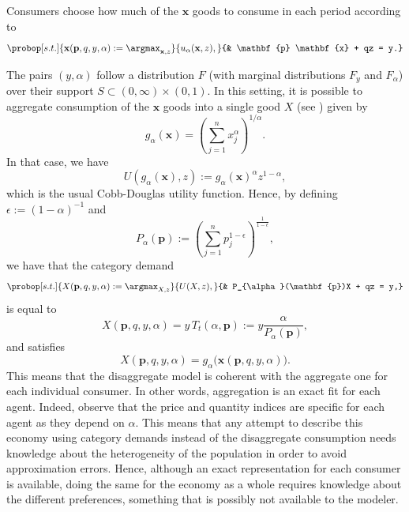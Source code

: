 \documentclass[english, a4paper, 12pt]{article}
\begin{document}
Consumers choose how much of the $\mathbf{x}$ goods to consume in each period according to
	\begin{equation} \label{eq:probdisagg}
		\probop[s.t.]{\mathbf{x}(\mathbf{p}, q, y, \alpha) 
			:= \argmax_{\mathbf{x}, z}}{u_{\alpha}(\mathbf{x}, z),}
				{&	\mathbf{p} \mathbf{x} + qz = y.}
	\end{equation} 

The pairs $(y,\alpha)$ follow a distribution $F$ (with marginal distributions $F_{y}$ and $F_{\alpha}$) over their support $S \subset (0,\infty) \times  (0,1)$. In this setting, it is possible to aggregate consumption of the $\mathbf{x}$ goods into a single good $X$ (see ) given by 
	\begin{equation} \label{eq:qtyindex}
		g_{\alpha}(\mathbf{x}) = \left(\sum_{j=1}^{n} x_{j}^{\alpha}\right)^{1/\alpha}.
	\end{equation}
In that case, we have
	\begin{equation} \label{eq:utilagg}
		U(g_{\alpha}(\mathbf{x}), z) := g_{\alpha}(\mathbf{x})^{\alpha}z^{1-\alpha},
	\end{equation}
which is the usual Cobb-Douglas utility function. Hence, by defining $\epsilon := (1-\alpha)^{-1}$ and
	\begin{equation} \label{eq:priceindex}
		P_{\alpha}(\mathbf{p}) :=  \left( \sum_{j=1}^{n} p_{j}^{1-\epsilon} \right)^{\frac{1}{1-\epsilon}},
	\end{equation}
we have that the category demand
	\begin{equation} \label{eq:probagg}
		\probop[s.t.]{X(\mathbf{p}, q, y, \alpha) := \argmax_{X, z}}{U(X,z),}
										{&	P_{\alpha}(\mathbf{p})X + qz = y,}
	\end{equation}
is equal to 
	\begin{equation} \label{eq:Xformula}
		X(\mathbf{p}, q,y,\alpha) = y\,T_{t}(\alpha, \mathbf{p}) := y \frac{\alpha}{P_{\alpha}(\mathbf{p})},
	\end{equation}
and satisfies 
	\begin{equation} \label{eq:aggequality}
		X(\mathbf{p}, q, y, \alpha) = g_{\alpha}\big(\mathbf{x}(\mathbf{p}, q, y, \alpha)\big).
	\end{equation}
This means that the disaggregate model is coherent with the aggregate one for each individual consumer. In other words, aggregation is an exact fit for each agent. Indeed, observe that the price and quantity indices are specific for each agent as they depend on $\alpha$. This means that any attempt to describe this economy using category demands instead of the disaggregate consumption needs knowledge about the heterogeneity of the population in order to avoid approximation errors. Hence, although an exact representation for each consumer is available, doing the same for the economy as a whole requires knowledge about the different preferences, something that is possibly not available to the modeler.
\end{document}

